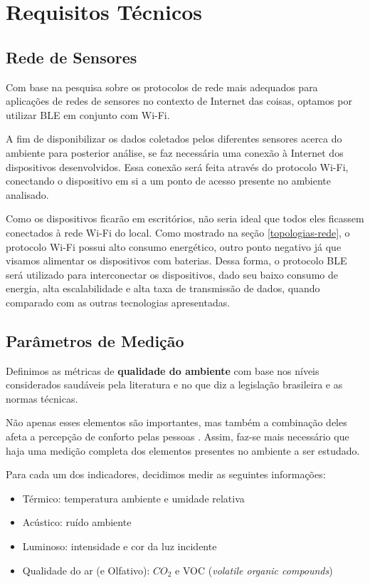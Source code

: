 \documentclass[../monografia.tex]{subfiles}
\begin{document}
\section{Requisitos Técnicos}

\subsection{Rede de Sensores}

Com base na pesquisa sobre os protocolos de rede mais adequados para aplicações de redes de sensores no contexto de Internet das coisas, optamos por utilizar BLE em conjunto com Wi-Fi. 

A fim de disponibilizar os dados coletados pelos diferentes sensores acerca do ambiente para posterior análise, se faz necessária uma conexão à Internet dos dispositivos desenvolvidos. Essa conexão será feita através do protocolo Wi-Fi, conectando o dispositivo em si a um ponto de acesso presente no ambiente analisado.

Como os dispositivos ficarão em escritórios, não seria ideal que todos eles ficassem conectados à rede Wi-Fi do local. Como mostrado na seção \ref{topologias-rede}, o protocolo Wi-Fi possui alto consumo energético, outro ponto negativo já que visamos alimentar os dispositivos com baterias. Dessa forma, o protocolo BLE será utilizado para interconectar os dispositivos, dado seu baixo consumo de energia, alta escalabilidade e alta taxa de transmissão de dados, quando comparado com as outras tecnologias apresentadas.

\subsection{Parâmetros de Medição} \label{specs-parametros}

Definimos as métricas de \textbf{qualidade do ambiente} com base nos níveis considerados saudáveis pela literatura e no que diz a legislação brasileira e as normas técnicas. 

Não apenas esses elementos são importantes, mas também a combinação deles afeta a percepção de conforto pelas pessoas \cite{ComfortOffice}. Assim, faz-se mais necessário que haja uma medição completa dos elementos presentes no ambiente a ser estudado.  

Para cada um dos indicadores, decidimos medir as seguintes informações:

\begin{itemize}
\item Térmico: temperatura ambiente e umidade relativa
\item Acústico: ruído ambiente
\item Luminoso: intensidade e cor da luz incidente
\item Qualidade do ar (e Olfativo): $CO_{2}$ e VOC (\textit{volatile organic compounds})
\end{itemize}
\end{document}
